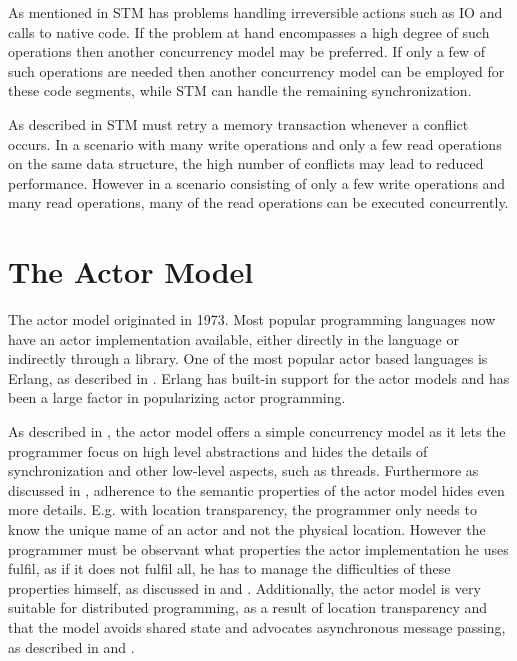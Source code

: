 As mentioned in  STM has problems handling irreversible actions such as \ac{IO} and calls to native code. If the problem at hand encompasses a high degree of such operations then another concurrency model may be preferred. If only a few of such operations are needed then another concurrency model can be employed for these code segments, while \ac{STM} can handle the remaining synchronization.

As described in  \ac{STM} must retry a memory transaction whenever a conflict occurs. In a scenario with many write operations and only a few read operations on the same data structure, the high number of conflicts may lead to reduced performance\cite[p. 311]{subramaniam2011programming}. However in a scenario consisting of only a few write operations and many read operations, many of the read operations can be executed concurrently.


\section{The Actor Model}\label{sec:choose_Actor}
The actor model originated in 1973\cite[p. 14]{haller2012actors}. Most popular programming languages now have an actor implementation available\cite[p. 152]{sevenModels}, either directly in the language or indirectly through a library. One of the most popular actor based languages is Erlang, as described in . Erlang has built-in support for the actor models and has been a large factor in popularizing actor programming\cite[p. 152]{sevenModels}.

As described in , the actor model offers a simple concurrency model as it lets the programmer focus on high level abstractions and hides the details of synchronization and other low-level aspects, such as threads. Furthermore as discussed in , adherence to the semantic properties of the actor model hides even more details. E.g. with location transparency, the programmer only needs to know the unique name of an actor and not the physical location. However the programmer must be observant what properties the actor implementation he uses fulfil, as if it does not fulfil all, he has to manage the difficulties of these properties himself, as discussed in  and . Additionally, the actor model is very suitable for distributed programming, as a result of location transparency and that the model avoids shared state and advocates asynchronous message passing, as described in  and .

